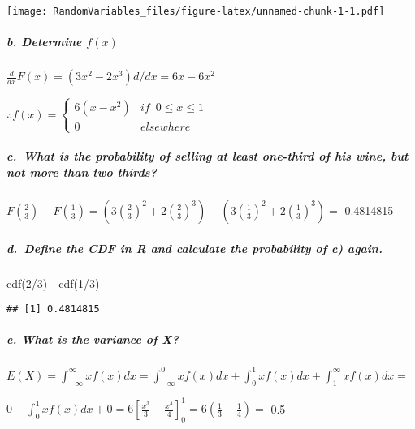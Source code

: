 \documentclass[
]{article}
\newenvironment{Shaded}{\begin{snugshade}}{\end{snugshade}}
\newcommand{\DecValTok}[1]{\textcolor[rgb]{0.00,0.00,0.81}{#1}}
\newcommand{\FunctionTok}[1]{\textcolor[rgb]{0.00,0.00,0.00}{#1}}
\newcommand{\NormalTok}[1]{#1}
\newcommand{\SpecialCharTok}[1]{\textcolor[rgb]{0.00,0.00,0.00}{#1}}
\begin{document}
\texttt{[image: RandomVariables\_files/figure-latex/unnamed-chunk-1-1.pdf]}

\hypertarget{b.-determine-fx}{%
\subparagraph{\texorpdfstring{b. Determine
\(f(x)\)}{b. Determine f(x)}}\label{b.-determine-fx}}

\(\frac{d}{dx} F(x)= (3x^2-2x^3)d/dx = 6x - 6x^2\)

\(\therefore f(x) = \left\{ \begin{array}{ll} 6(x - x^2) & if \enspace 0 \leq x \leq 1 \\ 0 & elsewhere \end{array} \right.\)

\hypertarget{c.-what-is-the-probability-of-selling-at-least-one-third-of-his-wine-but-not-more-than-two-thirds}{%
\subparagraph{c.~What is the probability of selling at least one-third
of his wine, but not more than two
thirds?}\label{c.-what-is-the-probability-of-selling-at-least-one-third-of-his-wine-but-not-more-than-two-thirds}}

\(F(\frac{2}{3}) - F(\frac{1}{3}) = \left( 3(\frac{2}{3})^2 + 2(\frac{2}{3})^3 \right) - \left( 3(\frac{1}{3})^2 + 2(\frac{1}{3})^3 \right) =\)
0.4814815

\hypertarget{d.-define-the-cdf-in-r-and-calculate-the-probability-of-c-again.}{%
\subparagraph{d.~Define the CDF in R and calculate the probability of c)
again.}\label{d.-define-the-cdf-in-r-and-calculate-the-probability-of-c-again.}}

\begin{Shaded}
\begin{Highlighting}[]
\FunctionTok{cdf}\NormalTok{(}\DecValTok{2}\SpecialCharTok{/}\DecValTok{3}\NormalTok{) }\SpecialCharTok{{-}} \FunctionTok{cdf}\NormalTok{(}\DecValTok{1}\SpecialCharTok{/}\DecValTok{3}\NormalTok{)}
\end{Highlighting}
\end{Shaded}

\begin{verbatim}
## [1] 0.4814815
\end{verbatim}

\hypertarget{e.-what-is-the-variance-of-x}{%
\subparagraph{e. What is the variance of
X?}\label{e.-what-is-the-variance-of-x}}

\(\displaystyle E(X) = \int_{-\infty}^\infty xf(x) dx = \int_{-\infty}^0xf(x)dx + \int_0^1xf(x)dx + \int_1^\infty xf(x)dx=\)

\(\displaystyle 0 + \int_0^1xf(x)dx + 0 = 6\left[ \frac{x^3}{3} - \frac{x^4}{4} \right]^1_0 = 6\left( \frac{1}{3} - \frac{1}{4} \right) =\)
0.5
\end{document}
